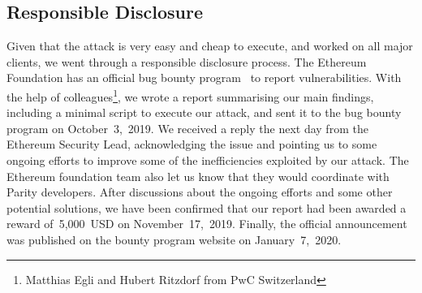 

\subsection{Responsible Disclosure}
\label{sec:responsible}
Given that the attack is very easy and cheap to execute, and worked on all major clients, we went through a responsible disclosure process. The Ethereum Foundation has an official bug bounty program~\cite{ethereum-bug-bounty} to report vulnerabilities. With the help of colleagues\footnote{Matthias Egli and Hubert Ritzdorf from PwC Switzerland}, we wrote a report summarising our main findings, including a minimal script to execute our attack, and sent it to the bug bounty program on October~3,~2019. We received a reply the next day from the Ethereum Security Lead, acknowledging the issue and pointing us to some ongoing efforts to improve some of the inefficiencies exploited by our attack. The Ethereum foundation team also let us know that they would coordinate with Parity developers. After discussions about the ongoing efforts and some other potential solutions, we have been confirmed that our report had been awarded a reward of~5,000~USD on November~17,~2019. Finally, the official announcement was published on the bounty program website on January~7,~2020.
